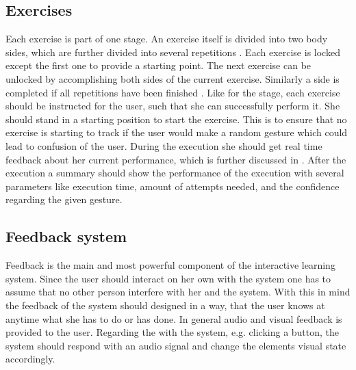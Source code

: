 \subsection{Exercises}
Each exercise is part of one stage. An exercise itself is divided into two body sides, which are further divided into several repetitions . Each exercise is locked except the first one to provide a starting point. The next exercise can be unlocked by accomplishing both sides of the current exercise. Similarly a side is completed if all repetitions have been finished . Like for the stage, each exercise should be instructed for the user, such that she can successfully perform it. She should stand in a starting position to start the exercise. This is to ensure that no exercise is starting to track if the user would make a random gesture which could lead to confusion of the user. During the execution she should get real time feedback about her current performance, which is further discussed in \textbf{}. After the execution a summary should show the performance of the execution with several parameters like execution time, amount of attempts needed, and the confidence regarding the given gesture.

\subsection{Feedback system}\label{4_1_5_feedbackSystem}
Feedback is the main and most powerful component of the interactive learning system. Since the user should interact on her own with the system one has to assume that no other person interfere with her and the system. With this in mind the feedback of the system should designed in a way, that the user knows at anytime what she has to do or has done. In general audio and visual feedback is provided to the user. Regarding the \textbf{} with the system, e.g. clicking a button, the system should respond with an audio signal and change the elements visual state accordingly.

